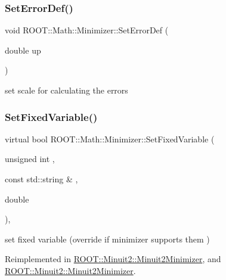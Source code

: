 \subsubsection{\texorpdfstring{SetErrorDef()}{SetErrorDef()}\hspace{0.1cm}{\footnotesize\ttfamily [2/2]}}
{\footnotesize\ttfamily void R\+O\+O\+T\+::\+Math\+::\+Minimizer\+::\+Set\+Error\+Def (\begin{DoxyParamCaption}\item[{double}]{up }\end{DoxyParamCaption})\hspace{0.3cm}{\ttfamily [inline]}}



set scale for calculating the errors 

\mbox{\label{classROOT_1_1Math_1_1Minimizer_a063e9d83c8a61afc8798ebb1d74b6f2b}} 
\subsubsection{\texorpdfstring{SetFixedVariable()}{SetFixedVariable()}\hspace{0.1cm}{\footnotesize\ttfamily [1/2]}}
{\footnotesize\ttfamily virtual bool R\+O\+O\+T\+::\+Math\+::\+Minimizer\+::\+Set\+Fixed\+Variable (\begin{DoxyParamCaption}\item[{unsigned int}]{,  }\item[{const std\+::string \&}]{,  }\item[{double}]{ }\end{DoxyParamCaption})\hspace{0.3cm}{\ttfamily [inline]}, {\ttfamily [virtual]}}



set fixed variable (override if minimizer supports them ) 



Reimplemented in \mbox{\hyperlink{classROOT_1_1Minuit2_1_1Minuit2Minimizer_af42341b80ebb02d8c0882beaa781e7bd}{R\+O\+O\+T\+::\+Minuit2\+::\+Minuit2\+Minimizer}}, and \mbox{\hyperlink{classROOT_1_1Minuit2_1_1Minuit2Minimizer_af42341b80ebb02d8c0882beaa781e7bd}{R\+O\+O\+T\+::\+Minuit2\+::\+Minuit2\+Minimizer}}.

